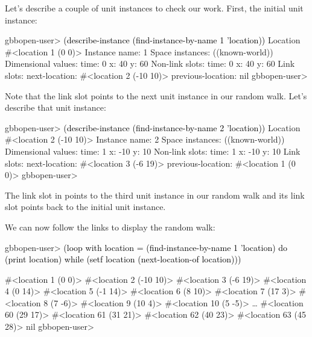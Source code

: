 \documentclass[10pt,twoside,english,pdftex]{article}
\begin{document}
Let's describe a couple of  unit instances to check our
work.  First, the initial  unit instance:
%
\W\supp
\begin{example}
\textcolor{darkergray}{%
  gbbopen-user> \textcolor{black}{(describe-instance (find-instance-by-name 1 'location))}
  Location #<location 1 (0 0)>
    Instance name: 1
    Space instances: ((known-world))
    Dimensional values:
      time:  0
      x:  40
      y:  60
    Non-link slots:
      time:  0
      x:  40
      y:  60
    Link slots:
      next-location:  #<location 2 (-10 10)>
      previous-location:  nil
  gbbopen-user>}
\end{example}
%
Note that the  link slot points to the next
 unit instance in our random walk.  Let's describe that
unit instance:
%
\W\supp\notpretop
\begin{example}
\textcolor{darkergray}{%
  gbbopen-user> \textcolor{black}{(describe-instance (find-instance-by-name 2 'location))}
  Location #<location 2 (-10 10)>
    Instance name: 2
    Space instances: ((known-world))
    Dimensional values:
      time:  1
      x:  -10
      y:  10
    Non-link slots:
      time:  1
      x:  -10
      y:  10
    Link slots:
      next-location:  #<location 3 (-6 19)>
      previous-location:  #<location 1 (0 0)>
  gbbopen-user>}
\end{example}
%
The  link slot in  
points to the third  unit instance in our random walk
and its  link slot points back to the initial
 unit instance.

We can now follow the links to display the random walk:
%
\W\supp
\begin{example}
\textcolor{darkergray}{%
  gbbopen-user> \textcolor{black}{(loop with location = (find-instance-by-name 1 'location) 
                  do (print location)
                  while (setf location (next-location-of location)))}

  #<location 1 (0 0)> 
  #<location 2 (-10 10)> 
  #<location 3 (-6 19)> 
  #<location 4 (0 14)> 
  #<location 5 (-1 14)> 
  #<location 6 (8 10)> 
  #<location 7 (17 3)> 
  #<location 8 (7 -6)> 
  #<location 9 (10 4)> 
  #<location 10 (5 -5)> 
     \textrm{\ldots{}}
  #<location 60 (29 17)> 
  #<location 61 (31 21)> 
  #<location 62 (40 23)> 
  #<location 63 (45 28)> 
  nil
  gbbopen-user>}
\end{example}
\end{document}
